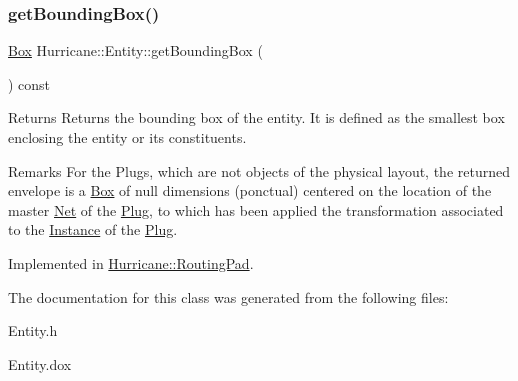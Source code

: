 \subsubsection{\texorpdfstring{get\+Bounding\+Box()}{getBoundingBox()}}
{\footnotesize\ttfamily \mbox{\hyperlink{classHurricane_1_1Box}{Box}} Hurricane\+::\+Entity\+::get\+Bounding\+Box (\begin{DoxyParamCaption}{ }\end{DoxyParamCaption}) const\hspace{0.3cm}{\ttfamily [pure virtual]}}

\begin{DoxyReturn}{Returns}
Returns the bounding box of the entity. It is defined as the smallest box enclosing the entity or its constituents.
\end{DoxyReturn}
\begin{DoxyRemark}{Remarks}
For the Plugs, which are not objects of the physical layout, the returned envelope is a \mbox{\hyperlink{classHurricane_1_1Box}{Box}} of null dimensions (ponctual) centered on the location of the master \mbox{\hyperlink{classHurricane_1_1Net}{Net}} of the \mbox{\hyperlink{classHurricane_1_1Plug}{Plug}}, to which has been applied the transformation associated to the \mbox{\hyperlink{classHurricane_1_1Instance}{Instance}} of the \mbox{\hyperlink{classHurricane_1_1Plug}{Plug}}. 
\end{DoxyRemark}


Implemented in \mbox{\hyperlink{classHurricane_1_1RoutingPad_a2cc2894b5e1c82b725dedcf1978dc773}{Hurricane\+::\+Routing\+Pad}}.



The documentation for this class was generated from the following files\+:\begin{DoxyCompactItemize}
\item 
Entity.\+h\item 
Entity.\+dox\end{DoxyCompactItemize}
